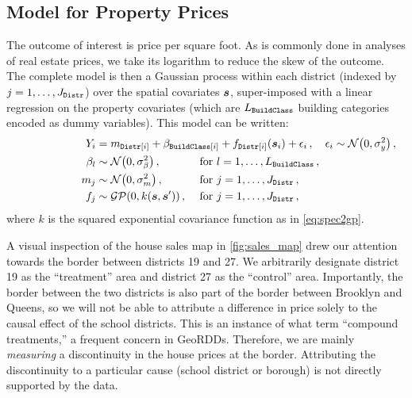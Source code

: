 \subsection{Model for Property Prices}
The outcome of interest is price per square foot.
As is commonly done in analyses of real estate prices, we take its logarithm to reduce the skew of the outcome.
The complete model is then a Gaussian process within each district (indexed by \(j=1,\dotsc,J_{\mathtt{Distr}}\)) over the spatial covariates \(\bm{s}\), super-imposed with a linear regression on the property covariates (which are \(L_{\mathtt{BuildClass}}\) building categories encoded as dummy variables).
This model can be written:
\begin{equation}
    \begin{aligned}
        Y_i &= %
        	m_{\district\sbr{i}} + \beta_{\building\sbr{i}}
        	+ f_{\district\sbr{i}}(\svec_i) + \epsilon_i 
			\,,\quad
 			\epsilon_i \sim \normal\del{0, \sigma_y^2} 
			\,,
			\phantom{\hspace{-10cm}} %
            \\
        \beta_{l} &\sim \normal\del{0, \sigma_\beta^2}
			\,,
			&&
			\text{ for }
			l=1,\dotsc,L_\building \,, \\
        m_{j} &\sim \normal\del{0, \sigmamu^2}
			\,,
			&&
			\text{ for }
			j=1,\dotsc,J_\district \,, \\
        f_j &\sim \GP\del{0, k(\svec, \svec')}
			\,,
			&&
			\text{ for }
			j=1,\dotsc,J_\district \,,
    \end{aligned}
    \label{eq:nyc_model}
\end{equation}
where \(k\) is the squared exponential covariance function as in \autoref{eq:spec2gp}.

A visual inspection of the house sales map in \autoref{fig:sales_map} drew our attention towards the border between districts 19 and 27.
We arbitrarily designate district 19 as the ``treatment'' area and district 27 as the ``control'' area.
Importantly, the border between the two districts is also part of the border between Brooklyn and Queens, so we will not be able to attribute a difference in price solely to the causal effect of the school districts.
This is an instance of what \cite{keele_titiunik_2015} term ``compound treatments,'' a frequent concern in GeoRDDs.
Therefore, we are mainly \emph{measuring} a discontinuity in the house prices at the border.
Attributing the discontinuity to a particular cause (school district or borough) is not directly supported by the data.

